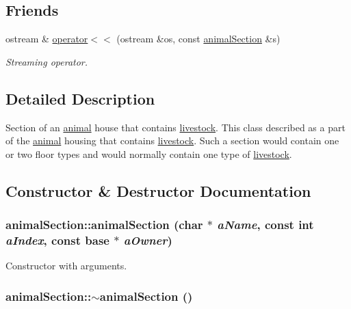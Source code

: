 \subsection*{Friends}
\begin{DoxyCompactItemize}
\item 
ostream \& \hyperlink{classanimal_section_afc0c5d745b4e8cb42de23c61aa1e2738}{operator$<$$<$} (ostream \&os, const \hyperlink{classanimal_section}{animalSection} \&s)
\begin{DoxyCompactList}\small\item\em Streaming operator. \item\end{DoxyCompactList}\end{DoxyCompactItemize}


\subsection{Detailed Description}
Section of an \hyperlink{classanimal}{animal} house that contains \hyperlink{classlivestock}{livestock}. This class described as a part of the \hyperlink{classanimal}{animal} housing that contains \hyperlink{classlivestock}{livestock}. Such a section would contain one or two floor types and would normally contain one type of \hyperlink{classlivestock}{livestock}. 

\subsection{Constructor \& Destructor Documentation}
\hypertarget{classanimal_section_ad2bba0c526d7ebf4b5b7f7f70c9c330a}{
\subsubsection[{animalSection}]{\setlength{\rightskip}{0pt plus 5cm}animalSection::animalSection (char $\ast$ {\em aName}, \/  const int {\em aIndex}, \/  const {\bf base} $\ast$ {\em aOwner})}}
\label{classanimal_section_ad2bba0c526d7ebf4b5b7f7f70c9c330a}


Constructor with arguments. \hypertarget{classanimal_section_a5d0ec0377589de7afd16ae207e5a172e}{
\subsubsection[{$\sim$animalSection}]{\setlength{\rightskip}{0pt plus 5cm}animalSection::$\sim$animalSection ()}}
\label{classanimal_section_a5d0ec0377589de7afd16ae207e5a172e}


